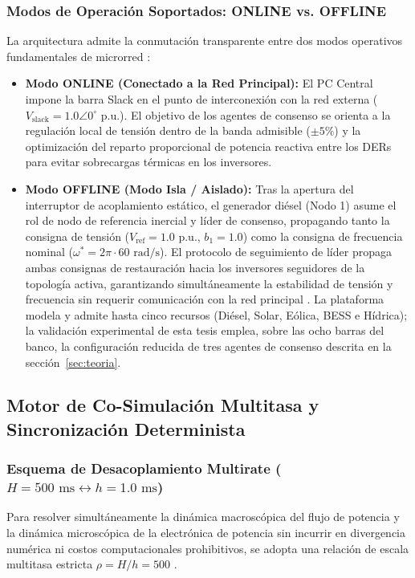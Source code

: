 \subsubsection{Modos de Operación Soportados: ONLINE vs. OFFLINE}

La arquitectura admite la conmutación transparente entre dos modos operativos fundamentales de microrred \citep{MartinezGomez2025Distributed}:
\begin{itemize}
    \item \textbf{Modo ONLINE (Conectado a la Red Principal):} El PC Central impone la barra Slack en el punto de interconexión con la red externa ($V_{\text{slack}} = 1.0 \angle 0^\circ\text{ p.u.}$). El objetivo de los agentes de consenso se orienta a la regulación local de tensión dentro de la banda admisible ($\pm 5\%$) y la optimización del reparto proporcional de potencia reactiva entre los DERs para evitar sobrecargas térmicas en los inversores.
    \item \textbf{Modo OFFLINE (Modo Isla / Aislado):} Tras la apertura del interruptor de acoplamiento estático, el generador diésel (Nodo 1) asume el rol de nodo de referencia inercial y líder de consenso, propagando tanto la consigna de tensión ($V_{\text{ref}} = 1.0\text{ p.u.}$, $b_1 = 1.0$) como la consigna de frecuencia nominal ($\omega^* = 2\pi \cdot 60\text{ rad/s}$). El protocolo de seguimiento de líder propaga ambas consignas de restauración hacia los inversores seguidores de la topología activa, garantizando simultáneamente la estabilidad de tensión y frecuencia sin requerir comunicación con la red principal \citep{Shrivastava2023FiniteTime}. La plataforma modela y admite hasta cinco recursos (Diésel, Solar, Eólica, BESS e Hídrica); la validación experimental de esta tesis emplea, sobre las ocho barras del banco, la configuración reducida de tres agentes de consenso descrita en la sección~\ref{sec:teoria}.
\end{itemize}

\subsection{Motor de Co-Simulación Multitasa y Sincronización Determinista}

\subsubsection{Esquema de Desacoplamiento Multirate (\texorpdfstring{$H = 500\text{ ms} \leftrightarrow h = 1.0\text{ ms}$}{H=500ms <-> h=1ms})}
Para resolver simultáneamente la dinámica macroscópica del flujo de potencia y la dinámica microscópica de la electrónica de potencia sin incurrir en divergencia numérica ni costos computacionales prohibitivos, se adopta una relación de escala multitasa estricta $\rho = H / h = 500$ \citep{Liu2025Multirate, Haid2022CosimCorrector}.

